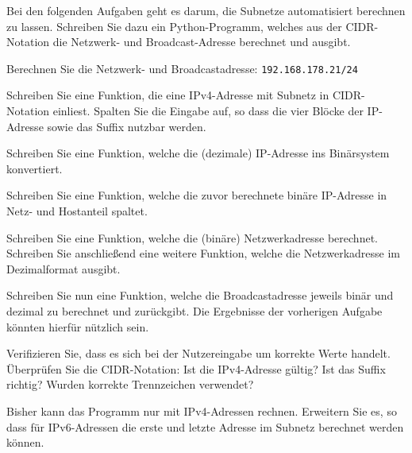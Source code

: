 \documentclass[11pt, a4paper, oneside]{article}
\begin{document}
	
	
	Bei den folgenden Aufgaben geht es darum, die Subnetze automatisiert berechnen zu lassen.
	Schreiben Sie dazu ein Python-Programm, welches aus der CIDR-Notation die Netzwerk- und Broadcast-Adresse berechnet und ausgibt.
	
	
	Berechnen Sie die Netzwerk- und Broadcastadresse: \texttt{192.168.178.21/24}
	
	\boxarea[7cm]
	
	
	Schreiben Sie eine Funktion, die eine IPv4-Adresse mit Subnetz in CIDR-Notation einliest.
	Spalten Sie die Eingabe auf, so dass die vier Blöcke der IP-Adresse sowie das Suffix nutzbar werden.
	
	
	
	Schreiben Sie eine Funktion, welche die (dezimale) IP-Adresse ins Binärsystem konvertiert.
	
	
	
	Schreiben Sie eine Funktion, welche die zuvor berechnete binäre IP-Adresse in Netz- und Hostanteil spaltet.
	
	
	Schreiben Sie eine Funktion, welche die (binäre) Netzwerkadresse berechnet.
	Schreiben Sie anschließend eine weitere Funktion, welche die Netzwerkadresse im Dezimalformat ausgibt.
	
	
	
	Schreiben Sie nun eine Funktion, welche die Broadcastadresse jeweils binär und dezimal zu berechnet und zurückgibt.
	Die Ergebnisse der vorherigen Aufgabe könnten hierfür nützlich sein.
	
	
	Verifizieren Sie, dass es sich bei der Nutzereingabe um korrekte Werte handelt.
	Überprüfen Sie die CIDR-Notation: Ist die IPv4-Adresse gültig? Ist das Suffix richtig? Wurden korrekte Trennzeichen verwendet?
	
	
	Bisher kann das Programm nur mit IPv4-Adressen rechnen.
	Erweitern Sie es, so dass für IPv6-Adressen die erste und letzte Adresse im Subnetz berechnet werden können.
	
\end{document}
